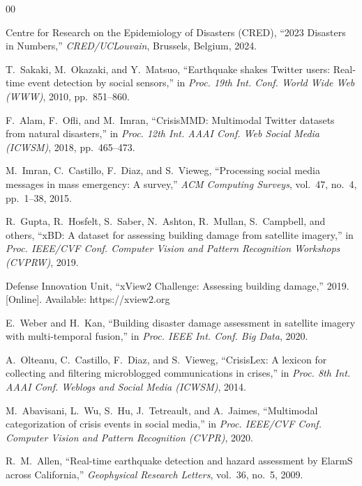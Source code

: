 \documentclass[journal]{IEEEtran}
\begin{document}
\begin{thebibliography}{00}

Centre for Research on the Epidemiology of Disasters (CRED), ``2023 Disasters in Numbers,'' \textit{CRED/UCLouvain}, Brussels, Belgium, 2024.

T.~Sakaki, M.~Okazaki, and Y.~Matsuo, ``Earthquake shakes Twitter users: Real-time event detection by social sensors,'' in \textit{Proc. 19th Int. Conf. World Wide Web (WWW)}, 2010, pp.~851--860.

F.~Alam, F.~Ofli, and M.~Imran, ``CrisisMMD: Multimodal Twitter datasets from natural disasters,'' in \textit{Proc. 12th Int. AAAI Conf. Web Social Media (ICWSM)}, 2018, pp.~465--473.

M.~Imran, C.~Castillo, F.~Diaz, and S.~Vieweg, ``Processing social media messages in mass emergency: A survey,'' \textit{ACM Computing Surveys}, vol.~47, no.~4, pp.~1--38, 2015.

R.~Gupta, R.~Hosfelt, S.~Saber, N.~Ashton, R.~Mullan, S.~Campbell, and others, ``xBD: A dataset for assessing building damage from satellite imagery,'' in \textit{Proc. IEEE/CVF Conf. Computer Vision and Pattern Recognition Workshops (CVPRW)}, 2019.

Defense Innovation Unit, ``xView2 Challenge: Assessing building damage,'' 2019. [Online]. Available: https://xview2.org

E.~Weber and H.~Kan, ``Building disaster damage assessment in satellite imagery with multi-temporal fusion,'' in \textit{Proc. IEEE Int. Conf. Big Data}, 2020.

A.~Olteanu, C.~Castillo, F.~Diaz, and S.~Vieweg, ``CrisisLex: A lexicon for collecting and filtering microblogged communications in crises,'' in \textit{Proc. 8th Int. AAAI Conf. Weblogs and Social Media (ICWSM)}, 2014.

M.~Abavisani, L.~Wu, S.~Hu, J.~Tetreault, and A.~Jaimes, ``Multimodal categorization of crisis events in social media,'' in \textit{Proc. IEEE/CVF Conf. Computer Vision and Pattern Recognition (CVPR)}, 2020.

R.~M.~Allen, ``Real-time earthquake detection and hazard assessment by ElarmS across California,'' \textit{Geophysical Research Letters}, vol.~36, no.~5, 2009.


\end{thebibliography}
\end{document}
